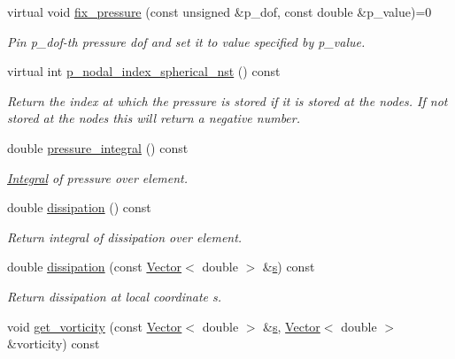 \begin{DoxyCompactItemize}
virtual void \hyperlink{classoomph_1_1SphericalNavierStokesEquations_ae4dc4c80f271ed2b31296f01862dc536}{fix\+\_\+pressure} (const unsigned \&p\+\_\+dof, const double \&p\+\_\+value)=0
\begin{DoxyCompactList}\small\item\em Pin p\+\_\+dof-\/th pressure dof and set it to value specified by p\+\_\+value. \end{DoxyCompactList}\item 
virtual int \hyperlink{classoomph_1_1SphericalNavierStokesEquations_a7b0edc8eedacaef9e55f3551a7cb5400}{p\+\_\+nodal\+\_\+index\+\_\+spherical\+\_\+nst} () const
\begin{DoxyCompactList}\small\item\em Return the index at which the pressure is stored if it is stored at the nodes. If not stored at the nodes this will return a negative number. \end{DoxyCompactList}\item 
double \hyperlink{classoomph_1_1SphericalNavierStokesEquations_a1776fe3c26e4ee175a0c71a2db66a78d}{pressure\+\_\+integral} () const
\begin{DoxyCompactList}\small\item\em \hyperlink{classoomph_1_1Integral}{Integral} of pressure over element. \end{DoxyCompactList}\item 
double \hyperlink{classoomph_1_1SphericalNavierStokesEquations_aa9939f3a44b64430e10e28657d70634c}{dissipation} () const
\begin{DoxyCompactList}\small\item\em Return integral of dissipation over element. \end{DoxyCompactList}\item 
double \hyperlink{classoomph_1_1SphericalNavierStokesEquations_aa1eb7bc1fb7513faafeda35e948c64b8}{dissipation} (const \hyperlink{classoomph_1_1Vector}{Vector}$<$ double $>$ \&\hyperlink{cfortran_8h_ab7123126e4885ef647dd9c6e3807a21c}{s}) const
\begin{DoxyCompactList}\small\item\em Return dissipation at local coordinate s. \end{DoxyCompactList}\item 
void \hyperlink{classoomph_1_1SphericalNavierStokesEquations_a0ef3334439b336f5ec21c7cd223e05f9}{get\+\_\+vorticity} (const \hyperlink{classoomph_1_1Vector}{Vector}$<$ double $>$ \&\hyperlink{cfortran_8h_ab7123126e4885ef647dd9c6e3807a21c}{s}, \hyperlink{classoomph_1_1Vector}{Vector}$<$ double $>$ \&vorticity) const

\end{DoxyCompactItemize}
